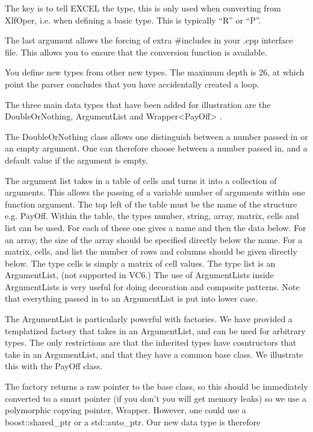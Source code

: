 \documentclass[12pt,reqno]{amsart}
\numberwithin{equation}{section}
\numberwithin{figure}{section}
\begin{document}
The key is to tell EXCEL the type, this is only used when converting
from XlfOper, i.e. when defining a basic type. This is typically ``R''
or ``P''.

The last argument allows the forcing of extra \#includes in your .cpp
interface file. This allows you to ensure that the conversion function
is available. 

You define new types from other new types. The maximum depth is 26, at
which point the parser concludes that you have accidentally created a
loop. 

The three main data types that have been added for illustration are the
DoubleOrNothing, ArgumentList and Wrapper<PayOff> . 

The DoubleOrNothing class allows one distinguish between a number passed in
or an empty argument. One can therefore choose between a number passed
in, and a default value if the argument is empty. 

The argument list takes in a table of cells and turns it into a
collection of arguments. This allows the passing of a variable number of
arguments within one function argument. The top left of the table must be
the name of the structure e.g. PayOff. Within the table, the types
number, string, array, matrix, cells and list can be used. For each of
these one gives a name and then the data below. For an array, the size
of the array should be specified directly below the name. For a
matrix, cells, and list the number of rows and columns should be given
directly below. The type cells is simply a matrix of cell values. The
type list is an ArgumentList, (not supported in VC6.) The use of
ArgumentLists inside ArgumentLists is very useful for doing
decoration and composite patterns. Note that everything passed in to an
ArgumentList is put into lower case. 

The ArgumentList is particularly powerful with factories. We have
 provided a templatized factory that takes in an ArgumentList, and can be
 used for arbitrary types. The only restrictions are that the
 inherited types have cosntructors that take in an ArgumentList, and
 that they have a common base class.  
 We illustrate this with the PayOff class. 

The factory returns a raw pointer to the base class, so this should be
immediately converted to a smart pointer (if you don't you will get
memory leaks) so we use a polymorphic copying pointer,
Wrapper. However, one could use a boost::shared\_ptr or a
std::auto\_ptr. Our new data type is therefore 
\end{document}
